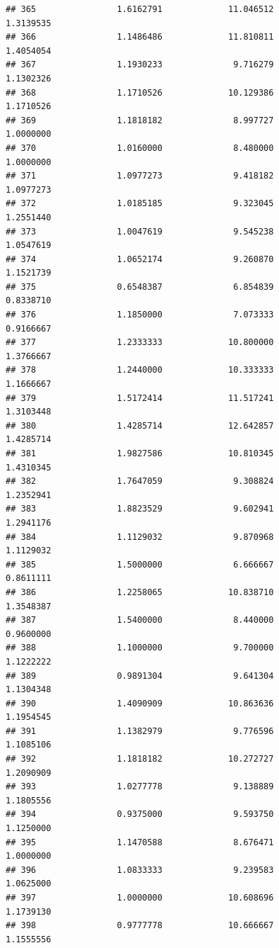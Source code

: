 \documentclass[]{article}
\begin{document}
\begin{verbatim}
## 365                1.6162791             11.046512               1.3139535
## 366                1.1486486             11.810811               1.4054054
## 367                1.1930233              9.716279               1.1302326
## 368                1.1710526             10.129386               1.1710526
## 369                1.1818182              8.997727               1.0000000
## 370                1.0160000              8.480000               1.0000000
## 371                1.0977273              9.418182               1.0977273
## 372                1.0185185              9.323045               1.2551440
## 373                1.0047619              9.545238               1.0547619
## 374                1.0652174              9.260870               1.1521739
## 375                0.6548387              6.854839               0.8338710
## 376                1.1850000              7.073333               0.9166667
## 377                1.2333333             10.800000               1.3766667
## 378                1.2440000             10.333333               1.1666667
## 379                1.5172414             11.517241               1.3103448
## 380                1.4285714             12.642857               1.4285714
## 381                1.9827586             10.810345               1.4310345
## 382                1.7647059              9.308824               1.2352941
## 383                1.8823529              9.602941               1.2941176
## 384                1.1129032              9.870968               1.1129032
## 385                1.5000000              6.666667               0.8611111
## 386                1.2258065             10.838710               1.3548387
## 387                1.5400000              8.440000               0.9600000
## 388                1.1000000              9.700000               1.1222222
## 389                0.9891304              9.641304               1.1304348
## 390                1.4090909             10.863636               1.1954545
## 391                1.1382979              9.776596               1.1085106
## 392                1.1818182             10.272727               1.2090909
## 393                1.0277778              9.138889               1.1805556
## 394                0.9375000              9.593750               1.1250000
## 395                1.1470588              8.676471               1.0000000
## 396                1.0833333              9.239583               1.0625000
## 397                1.0000000             10.608696               1.1739130
## 398                0.9777778             10.666667               1.1555556

\end{verbatim}
\end{document}
